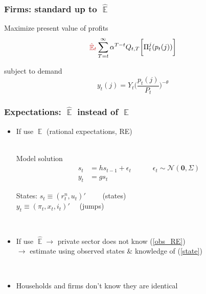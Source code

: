 \documentclass[11pt]{beamer}
\DeclareMathOperator{\E}{\mathbb{E}}
\begin{document}
\begin{frame}
	\frametitle{Firms: standard up to $\hat{\E}$}

Maximize present value of profits
\begin{equation}
\textcolor{brownreddark}{\hat{\E}_t}\sum^{\infty}_{T=t}\alpha^{T-t} Q_{t,T} \bigg[ \Pi^j_t(p_t(j))\bigg]
\label{lifetime_profits}
\end{equation}

subject to demand
\begin{equation}
y_t(j) = Y_t \bigg(\frac{p_t(j)}{P_t}\bigg)^{-\theta}
\end{equation}


\vfill

\hfill \hyperlink{details_HHs_firms}{}

\end{frame}

\begin{frame}
	\frametitle{Expectations: $\hat{\E}$ instead of $\E$}

\begin{itemize}
\item If use $\E$ (rational expectations, RE) \\

\

Model solution 
 \begin{align}
 s_t & = h s_{t-1} + \epsilon_t \quad \quad \quad \epsilon_t \sim \mathcal{N}(\mathbf{0},\Sigma) \label{state} \\
 y_t & = g s_t \label{obs_RE}
 \end{align}


States: $s_t \equiv (r^n_t, u_t)' \quad \quad $  (states) \\
$y_t \equiv (\pi_t, x_t, i_t)' \quad $ (jumps)

\

\pause

\item If use $\hat{\E} \rightarrow$ private sector does not know (\ref{obs_RE}) \\
$\rightarrow$ estimate using observed states \& knowledge of (\ref{state})

\

\item Households and firms don't know they are identical
\end{itemize}



\end{frame}
\end{document}
